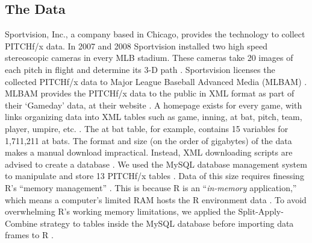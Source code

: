 \subsection{The Data} %
Sportvision, Inc., a company based in Chicago, provides the technology to collect PITCHf/x\textsuperscript{\textregistered} data. In 2007 and 2008 Sportvision installed two high speed stereoscopic cameras in every MLB\textsuperscript{\textregistered} stadium. These cameras take 20 images of each pitch in flight and determine its 3-D path \citep{Fast2010}. Sportsvision licenses the collected PITCHf/x\textsuperscript{\textregistered} data to Major League Baseball Advanced Media (MLBAM\textsuperscript{\textregistered}) \citep{Baumer2010}. MLBAM\textsuperscript{\textregistered} provides the PITCHf/x\textsuperscript{\textregistered} data to the public in XML format as part of  their  `Gameday' data, at their website \citep{Sievert2014}. A homepage exists for every game, with links organizing data into XML tables such as game, inning, at bat, pitch, team, player, umpire, etc. \citep{Sievert2014}. The at bat table, for example, contains 15 variables for 1,711,211 at bats. The format and size (on the order of gigabytes) of the data makes a manual download impractical. Instead, XML downloading scripts are advised to create a database \citep{Adler2006}. We used the MySQL database management system  to manipulate and store 13 PITCHf/x\textsuperscript{\textregistered} tables \citep{Tahaghoghi2006}. Data of this size requires finessing R's ``memory management'' \citep{Wickham2014}. This is because R is an ``{\it in-memory} application,'' which means a computer's limited RAM hosts the R environment data \citep{Smith2013}. To avoid overwhelming R's working memory limitations, we applied the Split-Apply-Combine strategy to tables inside the MySQL database before importing data frames to R \citep{Wickham2011}.


